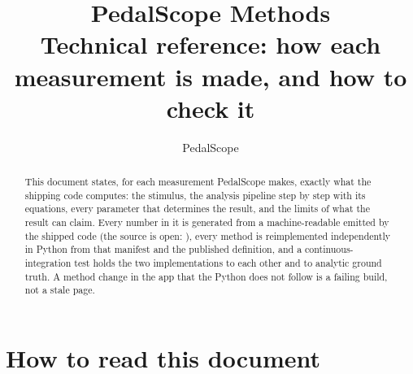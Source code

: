 \documentclass[11pt,a4paper]{article}
\title{PedalScope Methods\\\large Technical reference: how each measurement is made, and how to check it}
\author{PedalScope}
\date{\releasestamp}
\begin{document}
\maketitle

\begin{abstract}
This document states, for each measurement PedalScope makes, exactly what
the shipping code computes: the stimulus, the analysis pipeline step by step
with its equations, every parameter that determines the result, and the
limits of what the result can claim. Every number in it is generated from a
machine-readable  emitted by the shipped code (the source is
open: \repo), every method is
reimplemented independently in Python from that manifest and the published
definition, and a continuous-integration  test holds the two
implementations to each other and to analytic ground truth. A method change
in the app that the Python does not follow is a failing build, not a stale
page.
\end{abstract}
\licenceline

\tableofcontents
\clearpage

\section{How to read this document}
\end{document}
